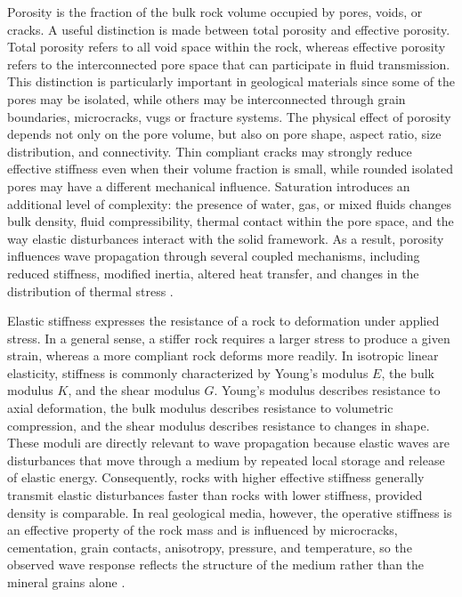 Porosity is the fraction of the bulk rock volume occupied by pores, voids, or cracks. A useful distinction is made between total porosity and effective porosity. Total porosity refers to all void space within the rock, whereas effective porosity refers to the interconnected pore space that can participate in fluid transmission. This distinction is particularly important in geological materials since some of the pores may be isolated, while others may be interconnected through grain boundaries, microcracks, vugs or fracture systems. The physical effect of porosity depends not only on the pore volume, but also on pore shape, aspect ratio, size distribution, and connectivity. Thin compliant cracks may strongly reduce effective stiffness even when their volume fraction is small, while rounded isolated pores may have a different mechanical influence. Saturation introduces an additional level of complexity: the presence of water, gas, or mixed fluids changes bulk density, fluid compressibility, thermal contact within the pore space, and the way elastic disturbances interact with the solid framework. As a result, porosity influences wave propagation through several coupled mechanisms, including reduced stiffness, modified inertia, altered heat transfer, and changes in the distribution of thermal stress \cite{wolff1982,mavko2009,jaeger2007}. %

Elastic stiffness expresses the resistance of a rock to deformation under applied stress. In a general sense, a stiffer rock requires a larger stress to produce a given strain, whereas a more compliant rock deforms more readily. In isotropic linear elasticity, stiffness is commonly characterized by Young's modulus $E$, the bulk modulus $K$, and the shear modulus $G$. Young's modulus describes resistance to axial deformation, the bulk modulus describes resistance to volumetric compression, and the shear modulus describes resistance to changes in shape. These moduli are directly relevant to wave propagation because elastic waves are disturbances that move through a medium by repeated local storage and release of elastic energy. Consequently, rocks with higher effective stiffness generally transmit elastic disturbances faster than rocks with lower stiffness, provided density is comparable. In real geological media, however, the operative stiffness is an effective property of the rock mass and is influenced by microcracks, cementation, grain contacts, anisotropy, pressure, and temperature, so the observed wave response reflects the structure of the medium rather than the mineral grains alone \cite{mavko2009,jaeger2007,aki2002}. %

